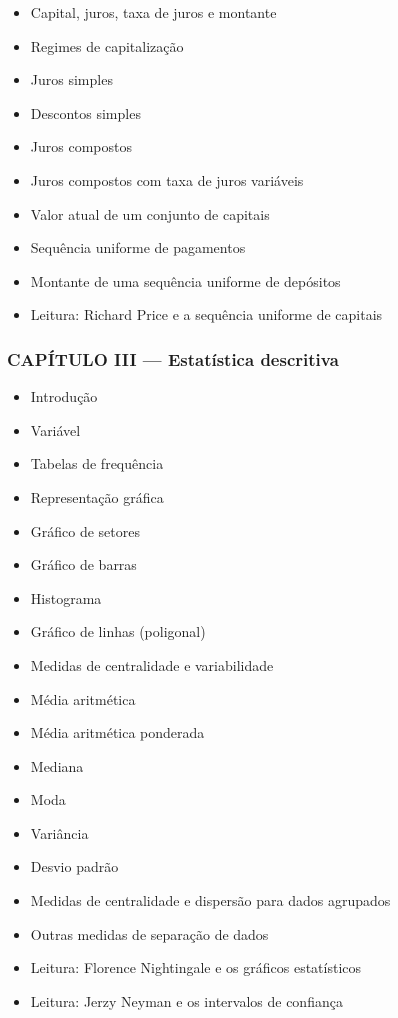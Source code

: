 \documentclass[a4paper,12pt]{article}[abntex2]
\begin{document}
\begin{itemize}
\item Capital, juros, taxa de juros e montante
\item Regimes de capitalização
\item Juros simples
\item Descontos simples
\item Juros compostos
\item Juros compostos com taxa de juros variáveis
\item Valor atual de um conjunto de capitais
\item Sequência uniforme de pagamentos
\item Montante de uma sequência uniforme de depósitos
\item Leitura: Richard Price e a sequência uniforme de capitais
\end{itemize}
\subsubsection*{CAPÍTULO III — Estatística descritiva}

\begin{itemize}
\item Introdução
\item Variável
\item Tabelas de frequência
\item Representação gráfica
\item Gráfico de setores
\item Gráfico de barras
\item Histograma
\item Gráfico de linhas (poligonal)
\item Medidas de centralidade e variabilidade
\item Média aritmética
\item Média aritmética ponderada
\item Mediana
\item Moda
\item Variância
\item Desvio padrão
\item Medidas de centralidade e dispersão para dados agrupados
\item Outras medidas de separação de dados
\item Leitura: Florence Nightingale e os gráficos estatísticos
\item Leitura: Jerzy Neyman e os intervalos de confiança
\end{itemize}
\end{document}

